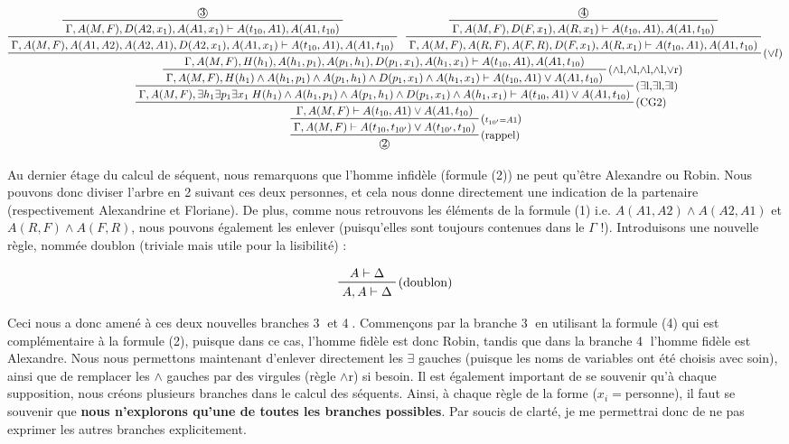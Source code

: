 \documentclass[10pt]{extarticle}
\begin{document}
\begin{landscape}
\begin{displaymath}
\prftree[r]{(rappel)}
{\prftree[r]{($\scriptstyle t_{10'}=A1$)}
{\prftree[r]{(CG2)}
{\prftree[r]{($\exists$l,$\exists$l,$\exists$l)}
{\prftree[r]{($\land$l,$\land$l,$\land$l,$\land$l,$\lor$r)}
{\prftree[r]{($\lor l$)}
{\prftree[r]{}
{\prftree[r]{}
{\text{\textcircled{3}}}
{\Gamma , A(M,F) , D(A2,x_1) , A(A1,x_1) \vdash A(t_{10},A1) , A(A1,t_{10})}}
{\Gamma , A(M,F) , A(A1,A2) , A(A2,A1) , D(A2,x_1) , A(A1,x_1) \vdash A(t_{10},A1) , A(A1,t_{10})}}
{\prftree[r]{}
{\prftree[r]{}
{\text{\textcircled{4}}}
{\Gamma , A(M,F) , D(F,x_1) , A(R,x_1) \vdash A(t_{10},A1) , A(A1,t_{10})}}
{\Gamma , A(M,F) , A(R,F) , A(F,R) , D(F,x_1) , A(R,x_1) \vdash A(t_{10},A1) , A(A1,t_{10})}}
{\Gamma , A(M,F) , H(h_1) , A(h_1,p_1) , A(p_1,h_1) , D(p_1,x_1) , A(h_1,x_1) \vdash A(t_{10},A1) , A(A1,t_{10})}}
{\Gamma , A(M,F) , H(h_1) \land A(h_1,p_1) \land A(p_1,h_1) \land D(p_1,x_1) \land A(h_1,x_1) \vdash A(t_{10},A1) \lor A(A1,t_{10})}}
{\Gamma , A(M,F) , \exists h_1 \exists p_1 \exists x_1 \; H(h_1) \land A(h_1,p_1) \land A(p_1,h_1) \land D(p_1,x_1) \land A(h_1,x_1) \vdash A(t_{10},A1) \lor A(A1,t_{10})}}
{\Gamma , A(M,F) \vdash A(t_{10},A1) \lor A(A1,t_{10})}}
{\Gamma , A(M,F) \vdash A(t_{10},t_{10'}) \lor A(t_{10'},t_{10})}}
{\text{\textcircled{2}}}
\end{displaymath}

Au dernier étage du calcul de séquent, nous remarquons que l'homme infidèle (formule (2)) ne peut qu'être Alexandre ou Robin. Nous pouvons donc diviser l'arbre en 2 suivant ces deux personnes, et cela nous donne directement une indication de la partenaire (respectivement Alexandrine et Floriane). De plus, comme nous retrouvons les éléments de la formule (1) i.e. $A(A1,A2) \land A(A2,A1)$ et $A(R,F) \land A(F,R)$, nous pouvons également les enlever (puisqu'elles sont toujours contenues dans le $\Gamma$ !). Introduisons une nouvelle règle, nommée doublon (triviale mais utile pour la lisibilité) :

\begin{displaymath}
\prftree[r]{(doublon)}
{A \vdash \Delta}
{A,A \vdash \Delta}
\end{displaymath}

Ceci nous a donc amené à ces deux nouvelles branches \textcircled{3} et \textcircled{4}. Commençons par la branche \textcircled{3} en utilisant la formule (4) qui est complémentaire à la formule (2), puisque dans ce cas, l'homme fidèle est donc Robin, tandis que dans la branche \textcircled{4} l'homme fidèle est Alexandre. Nous nous permettons maintenant d'enlever directement les $\exists$ gauches (puisque les noms de variables ont été choisis avec soin), ainsi que de remplacer les $\land$ gauches par des virgules (règle $\land$r) si besoin. Il est également important de se souvenir qu'à chaque supposition, nous créons plusieurs branches dans le calcul des séquents. Ainsi, à chaque règle de la forme ($x_i=$personne), il faut se souvenir que \textbf{nous n'explorons qu'une de toutes les branches possibles}. Par soucis de clarté, je me permettrai donc de ne pas exprimer les autres branches explicitement.


\end{landscape}
\end{document}
